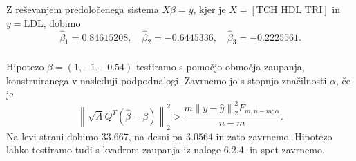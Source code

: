 \documentclass[ letterpaper, titlepage, fleqn]{article}
\newcommand{\norm}[1]{\left\lVert#1\right\rVert}
\begin{document}
\subsubsection{}
Z reševanjem predoločenega sistema $X\hat{\beta} = y$, kjer je $X = [\text{TCH HDL TRI}]$ in $y = \text{LDL}$,  dobimo
$$\hat{\beta}_1 = 0.84615208, \quad \hat{\beta}_2 = -0.6445336, \quad \hat{\beta}_3 =-0.2225561.$$

\subsubsection{}
Hipotezo  $\beta = (1,-1,-0.54)$  testiramo s pomočjo območja zaupanja, konstruiranega v naslednji podpodnalogi. Zavrnemo jo s stopnjo značilnosti $\alpha$, če je
$$\norm{\sqrt{\Lambda} Q^T (\hat{\beta} - \beta)}_2^2 > \frac{m \norm{y - \hat{y}}_2^2 F_{m, n-m; \alpha}}{n-m}.$$
Na levi strani dobimo $33.667$, na desni pa $3.0564$ in zato zavrnemo. Hipotezo lahko testiramo tudi s kvadrom zaupanja iz naloge 6.2.4. in spet zavrnemo.
\end{document}

